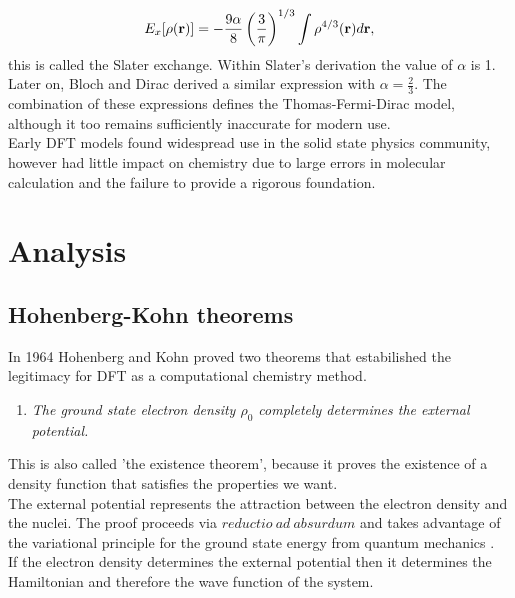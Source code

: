 \begin{equation}
    E_{x} [\rho({\bf r})] = -\frac{9 \alpha}{8} \left( \frac{3}{\pi} \right)^{1/3} \int \rho^{4/3}({\bf r}) d{\bf r},
\end{equation}
this is called the Slater exchange. Within Slater's derivation the value of $\alpha$ is 1. \\
Later on, Bloch and Dirac derived a similar expression with $\alpha = \frac{2}{3}$. The combination of these expressions defines the Thomas-Fermi-Dirac model, although it too remains sufficiently inaccurate for modern use. \\
Early DFT models found widespread use in the solid state physics community, however had little impact on chemistry due to large errors in molecular calculation and the failure to provide a rigorous foundation.

\section{Analysis}

\subsection{Hohenberg-Kohn theorems}
In 1964 Hohenberg and Kohn proved two theorems that estabilished the legitimacy for DFT as a computational chemistry method.

\begin{enumerate}
    \item \textit{The ground state electron density $\rho_0$ completely determines the external potential.}
\end{enumerate}
This is also called 'the existence theorem', because it proves the existence of a density function that satisfies the properties we want. \\
The external potential represents the attraction between the electron density and the nuclei. The proof proceeds via $reductio \ ad \ absurdum$ and takes advantage of the variational principle for the ground state energy from quantum mechanics \cite{Cramer2004Sep}. \\
If the electron density determines the external potential then it determines the Hamiltonian and therefore the wave function of the system.

